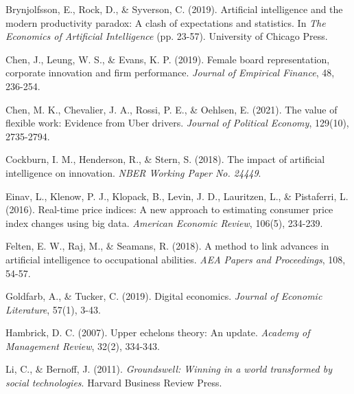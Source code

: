 \documentclass[12pt, a4paper]{article}
\begin{document}
\begin{thebibliography}{99}
Brynjolfsson, E., Rock, D., \& Syverson, C. (2019). Artificial intelligence and the modern productivity paradox: A clash of expectations and statistics. In \textit{The Economics of Artificial Intelligence} (pp. 23-57). University of Chicago Press.

Chen, J., Leung, W. S., \& Evans, K. P. (2019). Female board representation, corporate innovation and firm performance. \textit{Journal of Empirical Finance}, 48, 236-254.

Chen, M. K., Chevalier, J. A., Rossi, P. E., \& Oehlsen, E. (2021). The value of flexible work: Evidence from Uber drivers. \textit{Journal of Political Economy}, 129(10), 2735-2794.

Cockburn, I. M., Henderson, R., \& Stern, S. (2018). The impact of artificial intelligence on innovation. \textit{NBER Working Paper No. 24449}.

Einav, L., Klenow, P. J., Klopack, B., Levin, J. D., Lauritzen, L., \& Pistaferri, L. (2016). Real-time price indices: A new approach to estimating consumer price index changes using big data. \textit{American Economic Review}, 106(5), 234-239.

Felten, E. W., Raj, M., \& Seamans, R. (2018). A method to link advances in artificial intelligence to occupational abilities. \textit{AEA Papers and Proceedings}, 108, 54-57.

Goldfarb, A., \& Tucker, C. (2019). Digital economics. \textit{Journal of Economic Literature}, 57(1), 3-43.

Hambrick, D. C. (2007). Upper echelons theory: An update. \textit{Academy of Management Review}, 32(2), 334-343.

Li, C., \& Bernoff, J. (2011). \textit{Groundswell: Winning in a world transformed by social technologies}. Harvard Business Review Press.


\end{thebibliography}
\end{document}

